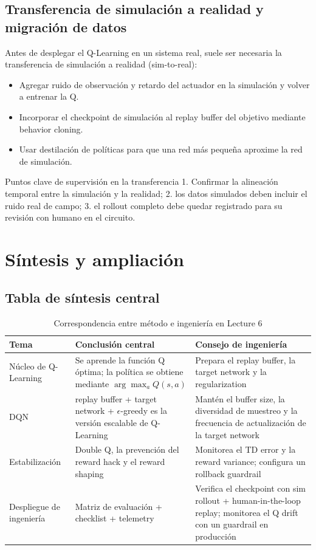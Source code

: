 \documentclass[a4paper]{article}
\begin{document}
\subsection{Transferencia de simulación a realidad y migración de datos}

Antes de desplegar el Q-Learning en un sistema real, suele ser necesaria la transferencia de simulación a realidad (sim-to-real):

\begin{itemize}
    \item Agregar ruido de observación y retardo del actuador en la simulación y volver a entrenar la Q.
    \item Incorporar el checkpoint de simulación al replay buffer del objetivo mediante behavior cloning.
    \item Usar destilación de políticas para que una red más pequeña aproxime la red de simulación.
\end{itemize}

\begin{importantbox}{Puntos clave de supervisión en la transferencia}
1. Confirmar la alineación temporal entre la simulación y la realidad; 2. los datos simulados deben incluir el ruido real de campo; 3. el rollout completo debe quedar registrado para su revisión con humano en el circuito.
\end{importantbox}
\section{Síntesis y ampliación}

\subsection{Tabla de síntesis central}

\begin{table}[H]
\centering
\begin{tabular}{p{} p{} p{}}
\toprule
Tema & Conclusión central & Consejo de ingeniería \\
\midrule
Núcleo de Q-Learning & Se aprende la función Q óptima; la política se obtiene mediante $\arg\max_a Q(s,a)$ & Prepara el replay buffer, la target network y la regularization \\
DQN & replay buffer + target network + $\epsilon$-greedy es la versión escalable de Q-Learning & Mantén el buffer size, la diversidad de muestreo y la frecuencia de actualización de la target network \\
Estabilización & Double Q, la prevención del reward hack y el reward shaping & Monitorea el TD error y la reward variance; configura un rollback guardrail \\
Despliegue de ingeniería & Matriz de evaluación + checklist + telemetry & Verifica el checkpoint con sim rollout + human-in-the-loop replay; monitorea el Q drift con un guardrail en producción \\
\bottomrule
\end{tabular}
\caption{Correspondencia entre método e ingeniería en Lecture 6}
\end{table}
\end{document}
